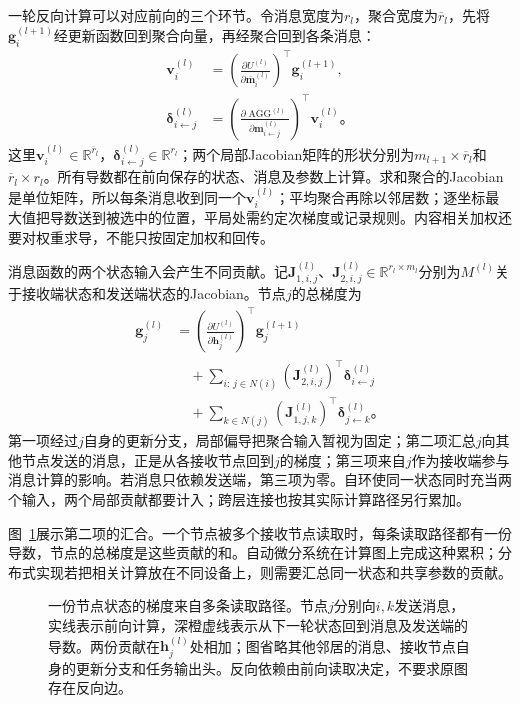 一轮反向计算可以对应前向的三个环节。令消息宽度为$r_l$，聚合宽度为$\overline r_l$，先将$\bm{g}_i^{(l+1)}$经更新函数回到聚合向量，再经聚合回到各条消息：
\begin{equation}
  \begin{aligned}
    \bm{v}_i^{(l)}
      &=\left(\frac{\partial U^{(l)}}
        {\partial\overline{\bm{m}}_i^{(l)}}\right)^{\top}
        \bm{g}_i^{(l+1)},\\
    \bm{\delta}_{i\leftarrow j}^{(l)}
      &=\left(\frac{\partial\operatorname{AGG}^{(l)}}
        {\partial\bm{m}_{i\leftarrow j}^{(l)}}\right)^{\top}
        \bm{v}_i^{(l)}\text{。}
  \end{aligned}
  \label{eq:gnn-message-adjoints}
\end{equation}
这里$\bm{v}_i^{(l)}\in\mathbb{R}^{\overline r_l}$，$\bm{\delta}_{i\leftarrow j}^{(l)}\in\mathbb{R}^{r_l}$；两个局部Jacobian矩阵的形状分别为$m_{l+1}\times\overline r_l$和$\overline r_l\times r_l$。所有导数都在前向保存的状态、消息及参数上计算。求和聚合的Jacobian是单位矩阵，所以每条消息收到同一个$\bm{v}_i^{(l)}$；平均聚合再除以邻居数；逐坐标最大值把导数送到被选中的位置，平局处需约定次梯度或记录规则。内容相关加权还要对权重求导，不能只按固定加权和回传。

消息函数的两个状态输入会产生不同贡献。记$\bm{J}_{1,i,j}^{(l)}$、$\bm{J}_{2,i,j}^{(l)}\in\mathbb{R}^{r_l\times m_l}$分别为$M^{(l)}$关于接收端状态和发送端状态的Jacobian。节点$j$的总梯度为
\begin{equation}
  \begin{aligned}
    \bm{g}_j^{(l)}
      &=\left(\frac{\partial U^{(l)}}
        {\partial\bm{h}_j^{(l)}}\right)^{\top}
        \bm{g}_j^{(l+1)}\\
      &\quad+\sum_{i:\,j\in N(i)}
        (\bm{J}_{2,i,j}^{(l)})^{\top}
        \bm{\delta}_{i\leftarrow j}^{(l)}\\
      &\quad+\sum_{k\in N(j)}
        (\bm{J}_{1,j,k}^{(l)})^{\top}
        \bm{\delta}_{j\leftarrow k}^{(l)}\text{。}
  \end{aligned}
  \label{eq:gnn-node-state-gradient}
\end{equation}
第一项经过$j$自身的更新分支，局部偏导把聚合输入暂视为固定；第二项汇总$j$向其他节点发送的消息，正是从各接收节点回到$j$的梯度；第三项来自$j$作为接收端参与消息计算的影响。若消息只依赖发送端，第三项为零。自环使同一状态同时充当两个输入，两个局部贡献都要计入；跨层连接也按其实际计算路径另行累加。

图~\ref{fig:gnn-backpropagation}展示第二项的汇合。一个节点被多个接收节点读取时，每条读取路径都有一份导数，节点的总梯度是这些贡献的和。自动微分系统在计算图上完成这种累积；分布式实现若把相关计算放在不同设备上，则需要汇总同一状态和共享参数的贡献。
\begin{figure}[htb]
  \centering
  
  \caption{一份节点状态的梯度来自多条读取路径。节点$j$分别向$i,k$发送消息，实线表示前向计算，深橙虚线表示从下一轮状态回到消息及发送端的导数。两份贡献在$\bm{h}_j^{(l)}$处相加；图省略其他邻居的消息、接收节点自身的更新分支和任务输出头。反向依赖由前向读取决定，不要求原图存在反向边。}
  \label{fig:gnn-backpropagation}
\end{figure}

